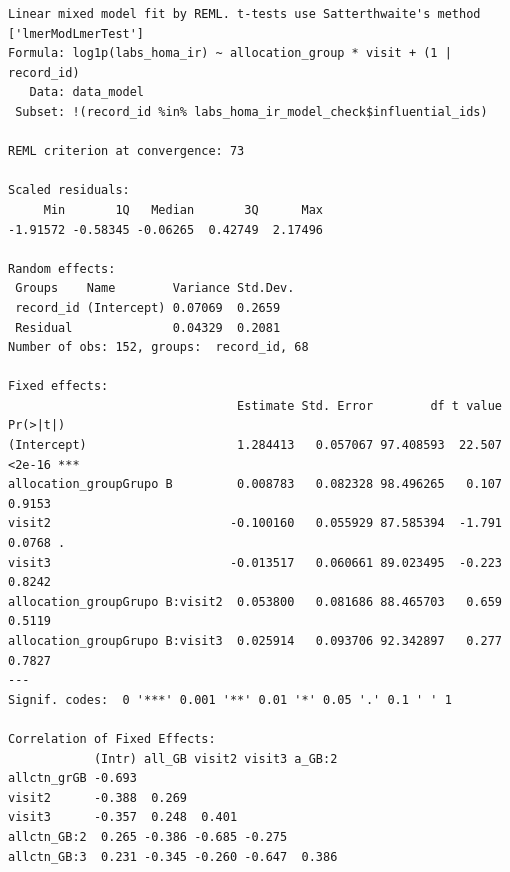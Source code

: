\documentclass[
  12pt,
]{article}
\newenvironment{Shaded}{\begin{snugshade}}{\end{snugshade}}
\newcommand{\NormalTok}[1]{\textcolor[rgb]{0.00,0.23,0.31}{#1}}
\newcommand{\SpecialCharTok}[1]{\textcolor[rgb]{0.37,0.37,0.37}{#1}}
\begin{document}
\begin{verbatim}
Linear mixed model fit by REML. t-tests use Satterthwaite's method ['lmerModLmerTest']
Formula: log1p(labs_homa_ir) ~ allocation_group * visit + (1 | record_id)
   Data: data_model
 Subset: !(record_id %in% labs_homa_ir_model_check$influential_ids)

REML criterion at convergence: 73

Scaled residuals: 
     Min       1Q   Median       3Q      Max 
-1.91572 -0.58345 -0.06265  0.42749  2.17496 

Random effects:
 Groups    Name        Variance Std.Dev.
 record_id (Intercept) 0.07069  0.2659  
 Residual              0.04329  0.2081  
Number of obs: 152, groups:  record_id, 68

Fixed effects:
                                Estimate Std. Error        df t value Pr(>|t|)    
(Intercept)                     1.284413   0.057067 97.408593  22.507   <2e-16 ***
allocation_groupGrupo B         0.008783   0.082328 98.496265   0.107   0.9153    
visit2                         -0.100160   0.055929 87.585394  -1.791   0.0768 .  
visit3                         -0.013517   0.060661 89.023495  -0.223   0.8242    
allocation_groupGrupo B:visit2  0.053800   0.081686 88.465703   0.659   0.5119    
allocation_groupGrupo B:visit3  0.025914   0.093706 92.342897   0.277   0.7827    
---
Signif. codes:  0 '***' 0.001 '**' 0.01 '*' 0.05 '.' 0.1 ' ' 1

Correlation of Fixed Effects:
            (Intr) all_GB visit2 visit3 a_GB:2
allctn_grGB -0.693                            
visit2      -0.388  0.269                     
visit3      -0.357  0.248  0.401              
allctn_GB:2  0.265 -0.386 -0.685 -0.275       
allctn_GB:3  0.231 -0.345 -0.260 -0.647  0.386
\end{verbatim}

\begin{Shaded}
\end{Shaded}
\end{document}
